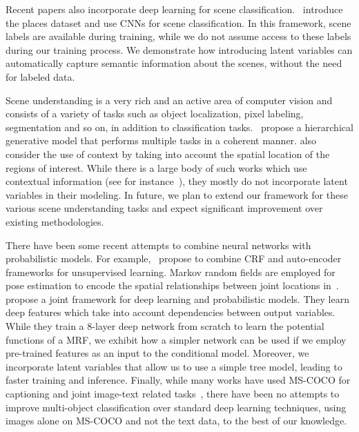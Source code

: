 \documentclass{article}
\begin{document}
Recent papers also incorporate deep learning for scene classification.~\cite{zhou2014learning,zhou2014object} introduce the places dataset and use CNNs for scene classification. In this framework, scene labels are available during training, while we do not assume access to these labels during our training process. We demonstrate how introducing latent variables can automatically capture semantic information about the scenes, without the need for labeled data.



Scene understanding is a very rich and an active area of computer vision and consists of a variety of tasks such as object localization, pixel labeling, segmentation and so on, in addition to classification tasks.~\cite{li2009towards} propose a hierarchical generative model that performs multiple tasks in a coherent manner. \cite{li2011theta} also consider the use of context by taking into account the spatial location of the regions of interest.
While there is a large body of such works which use contextual information (see for instance~\cite{li2011theta}), they mostly  do not incorporate latent variables in their modeling.  In future, we plan to extend our framework for these various scene understanding tasks and expect significant improvement over existing methodologies.




There have been some recent attempts to combine neural networks with probabilistic models. For example,~\cite{ammar2014conditional} propose to combine CRF and auto-encoder frameworks for unsupervised learning. Markov random fields are employed for  pose estimation to encode the spatial relationships between joint locations in~\cite{tompson2014joint}.~\cite{chen2014learning} propose a joint framework for deep learning and probabilistic models. They learn deep features which take into account dependencies between output variables. While they train a 8-layer deep network from scratch to learn the potential functions of a MRF, we exhibit how a simpler network can be used if we employ pre-trained features as an input to the conditional model. Moreover, we incorporate latent variables that allow us to use a simple tree model, leading to faster training and inference.  Finally, while many works have used MS-COCO for captioning and joint image-text related tasks~\cite{karpathy2014deep,vinyals2014show}, there have been no attempts to improve multi-object classification  over standard deep learning techniques, using images alone on MS-COCO and not the text data, to the best of our knowledge.
\end{document}
